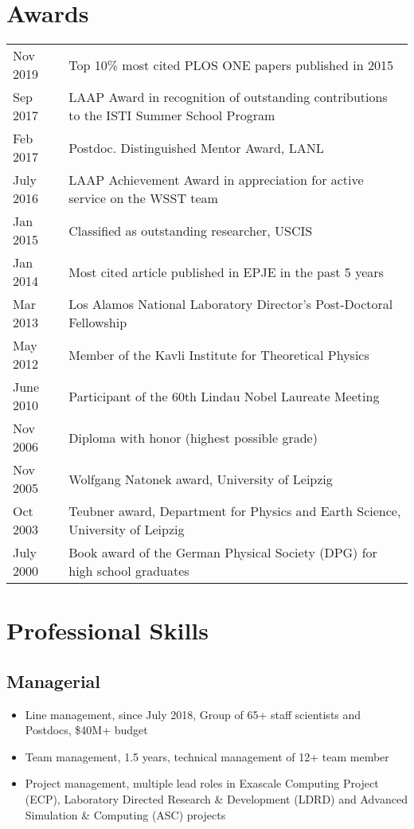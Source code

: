 \documentclass{article}
\begin{document}
\section*{Awards}
\begin{tabular}{ll}
Nov 2019 & Top 10\% most cited PLOS ONE papers published in 2015 \\
Sep 2017 & LAAP Award in recognition of outstanding contributions to the ISTI Summer School Program \\
Feb 2017 & Postdoc. Distinguished Mentor Award, LANL \\
July 2016 & LAAP Achievement Award in appreciation for active service on the WSST team \\
Jan 2015 & Classified as outstanding researcher, USCIS \\
Jan 2014 & Most cited article published in EPJE in the past 5 years \\
Mar 2013 & Los Alamos National Laboratory Director's Post-Doctoral Fellowship \\
May 2012 & Member of the Kavli Institute for Theoretical Physics\\
June 2010 & Participant of the 60th Lindau Nobel Laureate Meeting\\
Nov 2006 & Diploma with honor (highest possible grade) \\
Nov 2005  & Wolfgang Natonek award, University of Leipzig\\
Oct 2003  & Teubner award, Department for Physics and Earth Science, University of Leipzig\\
July 2000 & Book award of the German Physical Society (DPG) for high school graduates\\
\end{tabular}

\section*{Professional Skills}

\subsection*{Managerial}

\begin{itemize}
\setlength{\itemsep}{0pt}
\setlength{\parskip}{0pt}
\setlength{\parsep}{0pt}
\item Line management, since July 2018, Group of 65+ staff scientists and Postdocs, \$40M+ budget 
\item Team management, 1.5 years, technical management of 12+ team member
\item Project management, multiple lead roles in Exascale Computing Project (ECP), Laboratory Directed Research \& Development (LDRD) and Advanced Simulation \& Computing (ASC) projects 
\end{itemize}
\end{document}
